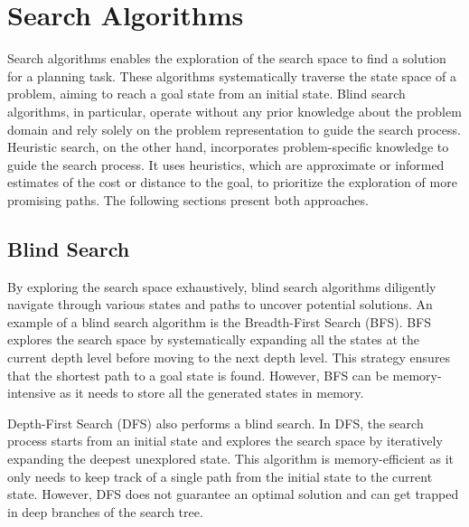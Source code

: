 \section{Search Algorithms}
\label{sec:background_searchalgorithms}

Search algorithms enables the exploration of the search space to find a solution for a planning task. These algorithms systematically traverse the state space of a problem, aiming to reach a goal state from an initial state. Blind search algorithms, in particular, operate without any prior knowledge about the problem domain and rely solely on the problem representation to guide the search process. Heuristic search, on the other hand, incorporates problem-specific knowledge to guide the search process. It uses heuristics, which are approximate or informed estimates of the cost or distance to the goal, to prioritize the exploration of more promising paths. The following sections present both approaches.

\subsection{Blind Search}
\label{sec:background_blindsearch}

By exploring the search space exhaustively, blind search algorithms diligently navigate through various states and paths to uncover potential solutions. An example of a blind search algorithm is the Breadth-First Search (BFS). BFS explores the search space by systematically expanding all the states at the current depth level before moving to the next depth level. This strategy ensures that the shortest path to a goal state is found. However, BFS can be memory-intensive as it needs to store all the generated states in memory.

Depth-First Search (DFS) also performs a blind search. In DFS, the search process starts from an initial state and explores the search space by iteratively expanding the deepest unexplored state. This algorithm is memory-efficient as it only needs to keep track of a single path from the initial state to the current state. However, DFS does not guarantee an optimal solution and can get trapped in deep branches of the search tree.

